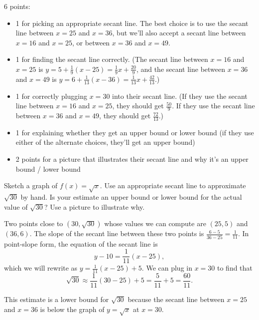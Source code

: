 \documentclass{article}
\begin{document}
\begin{enumerate}
  \begin{grading}
    6 points:
    \begin{itemize}
    \item 1 for picking an appropriate secant line. The best choice is to use the secant line between $x = 25$ and $x = 36$, but we'll also accept a secant line between $x = 16$ and $x = 25$, or between $x = 36$ and $x = 49$.
    \item 1 for finding the secant line correctly. (The secant line between $x = 16$ and $x = 25$ is $y = 5 + \frac{1}{9} (x - 25) = \frac{1}{9} x + \frac{20}{9}$, and the secant line between $x = 36$ and $x = 49$ is $y = 6 + \frac{1}{13} (x - 36) = \frac{1}{13} x + \frac{42}{13}$.)
    \item 1 for correctly plugging $x = 30$ into their secant line. (If they use the secant line between $x = 16$ and $x = 25$, they should get $\frac{50}{9}$. If they use the secant line between $x = 36$ and $x = 49$, they should get $\frac{72}{13}$.)
    \item 1 for explaining whether they get an upper bound or lower bound (if they use either of the alternate choices, they'll get an upper bound)
    \item 2 points for a picture that illustrates their secant line and why it's an upper bound / lower bound
    \end{itemize}    
  \end{grading}

  \begin{problem}[\nstretch{4}]
    Sketch a graph of $f(x) = \sqrt{x}$. Use an appropriate secant
    line to approximate $\sqrt{30}$ by hand. Is your estimate an upper bound or
    lower bound for the actual value of $\sqrt{30}$? Use a picture to
    illustrate why.
  \end{problem}

  \begin{solution}
    Two points close to $(30, \sqrt{30})$ whose values we can compute are $(25, 5)$ and $(36, 6)$. The slope
    of the secant line between these two points is $\frac{6-5}{36-25}=\frac{1}{11}$. In point-slope form, the
    equation of the secant line is
    \[y-10= \frac{1}{11}(x-25),\]
    which we will rewrite as $\boxed{y=\frac{1}{11}(x-25)+5}$.
    We can plug in $x=30$ to find that
    \[
        \sqrt{30} \approx \frac{1}{11}(30-25) + 5 
        = \frac{5}{11} + 5 
        = \frac{60}{11}.
    \]

    This estimate is a lower bound for $\sqrt{30}$ because the secant line between $x=25$ and $x=36$ is below the
    graph of $y=\sqrt{x}$ at $x=30$.
   

\end{solution}
\end{enumerate}
\end{document}
